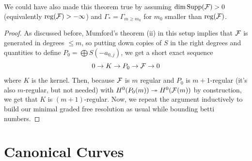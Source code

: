 \documentclass[12pt]{article}
\newcommand{\reg}{\mathrm{reg}}
\begin{document}
\begin{rmk}
    We could have also made this theorem true by assuming $\dim \mathrm{Supp}(\mathcal{F})>0$ (equivalently $\reg(\cF)>-\infty$) and $\Gamma_* = \Gamma_{m\geq m_0}$ for $m_0$ smaller than $\reg(\cF)$.
\end{rmk}

\begin{proof}
    As discussed before, Mumford's theorem (ii) in this setup implies that $\mathcal{F}$ is generated in degrees $\leq m$, so putting down copies of $S$ in the right degrees and quantities to define $P_0 = \bigoplus S(-a_{0,j})$, we get a short exact sequence
    \[0 \to K \to P_0 \to \mathcal{F} \to 0\]
    where $K$ is the kernel. Then, because $\mathcal{F}$ is $m$ regular and $P_0$ is $m+1$-regular (it's also $m$-regular, but not needed) with $H^0(P_0(m)) \twoheadrightarrow H^0(\mathcal{F}(m))$ by construction, we get that $K$ is $(m+1)$-regular. Now, we repeat the argument inductively to build our minimal graded free resolution as usual while bounding betti numbers.
\end{proof}

\section{Canonical Curves}



\nocite{*} %
\end{document}
